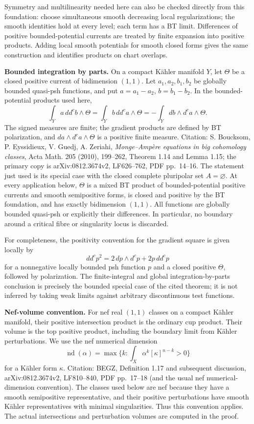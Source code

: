 \documentclass[
  11pt,
]{article}
\begin{document}
Symmetry and multilinearity needed here can also be checked directly
from this foundation: choose simultaneous smooth decreasing local
regularizations; the smooth identities hold at every level; each term
has a BT limit. Differences of positive bounded-potential currents are
treated by finite expansion into positive products. Adding local smooth
potentials for smooth closed forms gives the same construction and
identifies products on chart overlaps.

\textbf{Bounded integration by parts.} On a compact Kähler manifold
\(Y\), let \(\Theta\) be a closed positive current of bidimension
\((1,1)\). Let \(a_1,a_2,b_1,b_2\) be globally bounded quasi-psh
functions, and put \(a=a_1-a_2\), \(b=b_1-b_2\). In the
bounded-potential products used here, \[\int_Y a\,dd^cb\wedge\Theta
=\int_Y b\,dd^ca\wedge\Theta
=-\int_Y db\wedge d^ca\wedge\Theta. \tag{IBP}\] The signed measures are
finite; the gradient products are defined by BT polarization, and
\(da\wedge d^ca\wedge\Theta\) is a positive finite measure. Citation: S.
Boucksom, P. Eyssidieux, V. Guedj, A. Zeriahi, \emph{Monge--Ampère
equations in big cohomology classes}, Acta Math. 205 (2010), 199--262,
Theorem 1.14 and Lemma 1.15; the primary copy is arXiv:0812.3674v2,
LF626--762, PDF pp.~14--16. The statement just used is its special case
with the closed complete pluripolar set \(A=\varnothing\). At every
application below, \(\Theta\) is a mixed BT product of bounded-potential
positive currents and smooth semipositive forms, is closed and positive
by the BT foundation, and has exactly bidimension \((1,1)\). All
functions are globally bounded quasi-psh or explicitly their
differences. In particular, no boundary around a critical fibre or
singularity locus is discarded.

For completeness, the positivity convention for the gradient square is
given locally by \[dd^c p^2=2\,dp\wedge d^cp+2p\,dd^cp\] for a
nonnegative locally bounded psh function \(p\) and a closed positive
\(\Theta\), followed by polarization. The finite-integral and global
integration-by-parts conclusion is precisely the bounded special case of
the cited theorem; it is not inferred by taking weak limits against
arbitrary discontinuous test functions.

\textbf{Nef-volume convention.} For nef real \((1,1)\) classes on a
compact Kähler manifold, their positive intersection product is the
ordinary cup product. Their volume is the top positive product,
including the boundary limit from Kähler perturbations. We use the nef
numerical dimension
\[\operatorname{nd}(\alpha)=\max\{k:\int_X\alpha^k[\kappa]^{n-k}>0\}\]
for a Kähler form \(\kappa\). Citation: BEGZ, Definition 1.17 and
subsequent discussion, arXiv:0812.3674v2, LF810--840, PDF pp.~17--18
(and the usual nef numerical-dimension convention). The classes used
below are nef because they have a smooth semipositive representative,
and their positive perturbations have smooth Kähler representatives with
minimal singularities. Thus this convention applies. The actual
intersections and perturbation volumes are computed in the proof.
\end{document}
